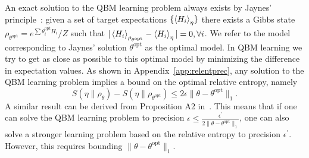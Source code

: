 \documentclass[
    aps,
    prx,
    onecolumn
]{revtex4-2}
\begin{document}
An exact solution to the QBM learning problem always exists by Jaynes' principle~\cite{jaynes1957}: given a set of target expectations $\{ \expval{H_i}_\eta \}$ there exists a Gibbs state $\rho_{\theta^{\mathrm{opt}}} = e^{\sum \theta^{\mathrm{opt}}_i H_i}/Z$ such that $| \expval{H_i}_{\rho_{\theta^{\mathrm{opt}}}}  - \expval{H_i}_\eta |= 0, \forall i$. We refer to the model corresponding to Jaynes' solution $\theta^{\mathrm{opt}}$ as the optimal model. In QBM learning we try to get as close as possible to this optimal model by minimizing the difference in expectation values. As shown in Appendix~\ref{app:relentprec}, any solution to the QBM learning problem implies a bound on the optimal relative entropy, namely 
\begin{equation}
\label{eq:relentropbound}
    S(\eta\|\rho_{\theta}) -  S(\eta\|\rho_{\theta^{\mathrm{opt}}}) \leq 2 \epsilon \| \theta - \theta^\textrm{opt} \|_1 .
\end{equation} 
A similar result can be derived from Proposition A2 in~\cite{Rouze_2023}. This means that if one can solve the QBM learning problem to precision $\epsilon \leq \frac{\epsilon^\prime}{2\| \theta - \theta^\textrm{opt} \|_1}$, one can also solve a stronger learning problem based on the relative entropy to precision $\epsilon^\prime$. However, this requires bounding $\| \theta - \theta^\textrm{opt} \|_1$.
\end{document}
